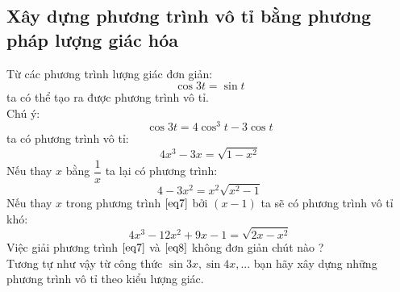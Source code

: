 \subsection{Xây dựng phương trình vô tỉ bằng phương pháp lượng giác hóa}
Từ các phương trình lượng giác đơn giản: $$\cos 3t = \sin t$$
ta có thể tạo ra được phương trình vô tỉ.\\
Chú ý:  $$\cos 3t = 4\cos ^3 t - 3\cos t$$ ta có phương trình vô tỉ: 
\begin{equation} \label{eq6}
4x^3 - 3x = \sqrt {1 - x^2 } 
\end{equation}
Nếu thay $x$ bằng $\dfrac{1}{x}$ ta lại có phương trình: 
\begin{equation} \label{eq7}
4 - 3x^2 = x^2 \sqrt {x^2 - 1}
\end{equation}
Nếu thay $x$ trong phương trình $\eqref{eq7}$ bởi $(x-1)$ ta sẽ có phương trình vô tỉ khó: 
\begin{equation} \label{eq8}
4x^3 - 12x^2 + 9x - 1 = \sqrt {2x - x^2 }
\end{equation}
Việc giải phương trình $\eqref{eq7}$ và $\eqref{eq8}$ không đơn giản chút nào ?\\
Tương tự như vậy từ công thức $\sin 3x, \sin 4x ,... $ bạn hãy xây dựng những phương trình vô tỉ theo kiểu lượng giác.

